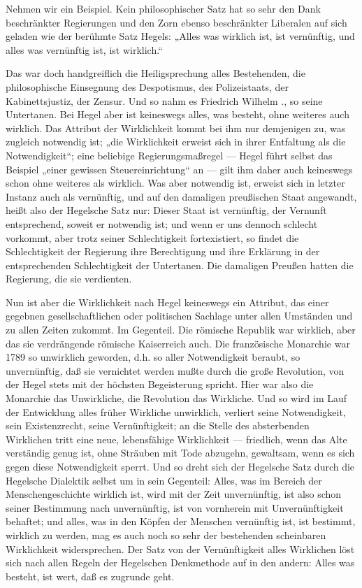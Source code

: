 Nehmen wir ein Beispiel. Kein philosophischer Satz hat so sehr
den Dank beschränkter Regierungen und den Zorn ebenso beschränkter
Liberalen auf sich geladen wie der berühmte Satz Hegels: „Alles was
wirklich ist, ist vernünftig, und alles was vernünftig ist, ist
wirklich.``

Das war doch handgreiflich die Heiligsprechung alles
Bestehenden, die philosophische Einsegnung des Despotismus, des
Polizeistaats, der Kabinettsjustiz, der Zensur. Und so nahm es Friedrich
Wilhelm ., so seine Untertanen. Bei Hegel aber ist keineswegs alles,
was besteht, ohne weiteres auch wirklich. Das Attribut der Wirklichkeit
kommt bei ihm nur demjenigen zu, was zugleich notwendig ist; „die
Wirklichkeit erweist sich in ihrer Entfaltung als die Notwendigkeit``;
eine beliebige Regierungsmaßregel --- Hegel führt selbst das Beispiel
„einer gewissen Steuereinrichtung`` an --- gilt ihm daher auch keineswegs
schon ohne weiteres als wirklich. Was aber notwendig ist, erweist sich
in letzter Instanz auch als vernünftig, und auf den damaligen
preußischen Staat angewandt, heißt also der Hegelsche Satz nur: Dieser
Staat ist vernünftig, der Vernunft entsprechend, soweit er notwendig
ist; und wenn er uns dennoch schlecht vorkommt, aber trotz seiner
Schlechtigkeit fortexistiert, so findet die Schlechtigkeit der Regierung
ihre Berechtigung und ihre Erklärung in der entsprechenden
Schlechtigkeit der Untertanen. Die damaligen Preußen hatten die
Regierung, die sie verdienten.

Nun ist aber die Wirklichkeit nach Hegel keineswegs ein
Attribut, das einer gegebnen gesellschaftlichen oder politischen
Sachlage unter allen Umständen und zu allen Zeiten zukommt. Im
Gegenteil. Die römische Republik war wirklich, aber das \textbar{} sie
verdrängende \textbar{} römische Kaiserreich auch. Die französische Monarchie war
\textbar{} 1789 \textbar{} so unwirklich geworden, d.h. so aller Notwendigkeit beraubt, so
unvernünftig, daß sie vernichtet werden mußte durch die große
Revolution, von der Hegel stets mit der höchsten Begeisterung spricht.
Hier war also die Monarchie das Unwirkliche, die Revolution das
Wirkliche. Und so wird im Lauf der Entwicklung alles früher Wirkliche
unwirklich, verliert seine Notwendigkeit, sein Existenzrecht, seine
Vernünftigkeit; an die Stelle des absterbenden Wirklichen tritt eine
neue, lebensfähige Wirklichkeit --- friedlich, wenn das Alte verständig
genug ist, ohne Sträuben mit Tode abzugehn, gewaltsam, wenn es sich
gegen diese Notwendigkeit sperrt. Und so dreht sich der Hegelsche Satz
durch die Hegelsche Dialektik selbst um in sein Gegenteil: Alles, was im
Bereich der Menschengeschichte wirklich ist, wird mit der Zeit
unvernünftig, ist also schon seiner Bestimmung nach unvernünftig, ist
von vornherein mit Unvernünftigkeit behaftet; und alles, was in den
Köpfen der Menschen vernünftig ist, ist bestimmt, wirklich zu werden,
mag es auch noch so sehr der bestehenden scheinbaren Wirklichkeit
widersprechen. Der Satz von der Vernünftigkeit alles Wirklichen löst
sich nach allen Regeln der Hegelschen Denkmethode auf in den andern:
Alles was besteht, ist wert, daß es zugrunde geht.

